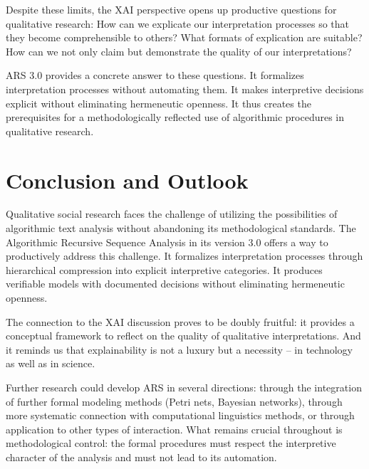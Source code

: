 \documentclass[
  12pt,
  a4paper,
  oneside,
  titlepage
]{article}
\begin{document}
Despite these limits, the XAI perspective opens up productive questions 
for qualitative research: How can we explicate our interpretation 
processes so that they become comprehensible to others? What formats of 
explication are suitable? How can we not only claim but demonstrate the 
quality of our interpretations?

ARS 3.0 provides a concrete answer to these questions. It formalizes 
interpretation processes without automating them. It makes interpretive 
decisions explicit without eliminating hermeneutic openness. It thus 
creates the prerequisites for a methodologically reflected use of 
algorithmic procedures in qualitative research.

\section{Conclusion and Outlook}

Qualitative social research faces the challenge of utilizing the 
possibilities of algorithmic text analysis without abandoning its 
methodological standards. The Algorithmic Recursive Sequence Analysis 
in its version 3.0 offers a way to productively address this challenge. 
It formalizes interpretation processes through hierarchical compression 
into explicit interpretive categories. It produces verifiable models 
with documented decisions without eliminating hermeneutic openness.

The connection to the XAI discussion proves to be doubly fruitful: 
it provides a conceptual framework to reflect on the quality of 
qualitative interpretations. And it reminds us that explainability is 
not a luxury but a necessity – in technology as well as in science.

Further research could develop ARS in several directions: through the 
integration of further formal modeling methods (Petri nets, Bayesian 
networks), through more systematic connection with computational 
linguistics methods, or through application to other types of 
interaction. What remains crucial throughout is methodological control: 
the formal procedures must respect the interpretive character of the 
analysis and must not lead to its automation.
\end{document}
